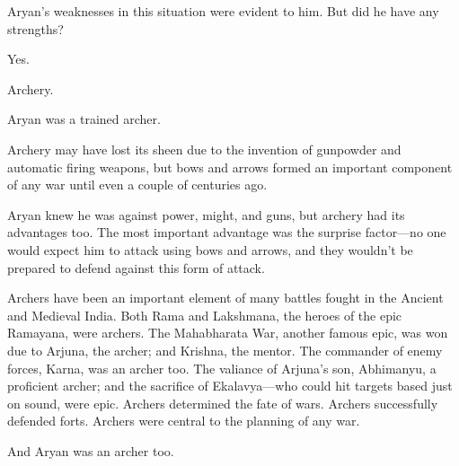 Aryan's weaknesses in this situation were evident to him. But did he have any
strengths?

Yes.

Archery.

Aryan was a trained archer.

Archery may have lost its sheen due to the invention of gunpowder and automatic
firing weapons, but bows and arrows formed an important component of any war
until even a couple of centuries ago.

Aryan knew he was against power, might, and guns, but archery had its advantages
too. The most important advantage was the surprise factor—no one would expect
him to attack using bows and arrows, and they wouldn't be prepared to defend
against this form of attack.

Archers have been an important element of many battles fought in the Ancient and
Medieval India. Both Rama and Lakshmana, the heroes of the epic Ramayana, were
archers. The Mahabharata War, another famous epic, was won due to Arjuna, the
archer; and Krishna, the mentor. The commander of enemy forces, Karna, was an
archer too. The valiance of Arjuna's son, Abhimanyu, a proficient archer; and
the sacrifice of Ekalavya—who could hit targets based just on sound, were
epic. Archers determined the fate of wars. Archers successfully defended forts.
Archers were central to the planning of any war.

And Aryan was an archer too.